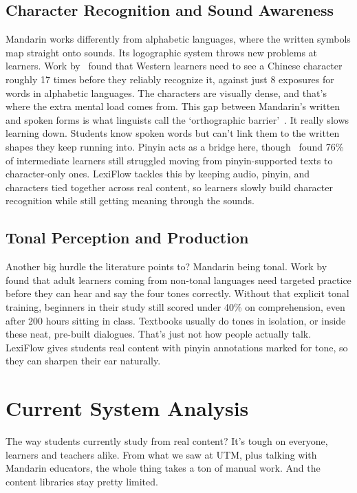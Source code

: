 \subsection{Character Recognition and Sound Awareness}Mandarin works differently from alphabetic languages, where the written symbols map straight onto sounds. Its logographic system throws new problems at learners. Work by~\citet{everson2011} found that Western learners need to see a Chinese character roughly 17 times before they reliably recognize it, against just 8 exposures for words in alphabetic languages. The characters are visually dense, and that's where the extra mental load comes from. This gap between Mandarin's written and spoken forms is what linguists call the `orthographic barrier'~\citep{shen2007}. It really slows learning down. Students know spoken words but can't link them to the written shapes they keep running into. Pinyin acts as a bridge here, though~\citet{ye2013} found 76\% of intermediate learners still struggled moving from pinyin-supported texts to character-only ones. LexiFlow tackles this by keeping audio, pinyin, and characters tied together across real content, so learners slowly build character recognition while still getting meaning through the sounds.
\subsection{Tonal Perception and Production}Another big hurdle the literature points to? Mandarin being tonal. Work by~\citet{wang1999} found that adult learners coming from non-tonal languages need targeted practice before they can hear and say the four tones correctly. Without that explicit tonal training, beginners in their study still scored under 40\% on comprehension, even after 200 hours sitting in class. Textbooks usually do tones in isolation, or inside these neat, pre-built dialogues. That's just not how people actually talk. LexiFlow gives students real content with pinyin annotations marked for tone, so they can sharpen their ear naturally.
\section{Current System Analysis}The way students currently study from real content? It's tough on everyone, learners and teachers alike. From what we saw at UTM, plus talking with Mandarin educators, the whole thing takes a ton of manual work. And the content libraries stay pretty limited.
